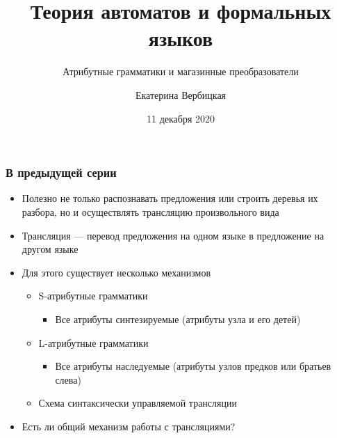\documentclass{beamer}
\title[]{Теория автоматов и формальных языков}
\subtitle[]{Атрибутные грамматики и магазинные преобразователи}
\institute[]{
Санкт-Петербургский государственный электротехнический университет <<ЛЭТИ>>\\
}
\author[]{Екатерина Вербицкая}
\date{11 декабря 2020}
\begin{document}
{
  \begin{frame}
    \titlepage
  \end{frame}
}

\begin{frame}[fragile]
  \transwipe[direction=90]
  \frametitle{В предыдущей серии}
  \begin{itemize}
    \item Полезно не только распознавать предложения или строить деревья их разбора, но и осуществлять трансляцию произвольного вида
    \item Трансляция --- перевод предложения на одном языке в предложение на другом языке
    \item Для этого существует несколько механизмов
    \begin{itemize}
      \item S-атрибутные грамматики
      \begin{itemize}
        \item Все атрибуты синтезируемые (атрибуты узла и его детей)
      \end{itemize}
      \item L-атрибутные грамматики
      \begin{itemize}
        \item Все атрибуты наследуемые (атрибуты узлов предков или братьев слева)
      \end{itemize}
      \item Схема синтаксически управляемой трансляции
    \end{itemize}
    \item Есть ли общий механизм работы с трансляциями?
  \end{itemize}
\end{frame}
\end{document}
